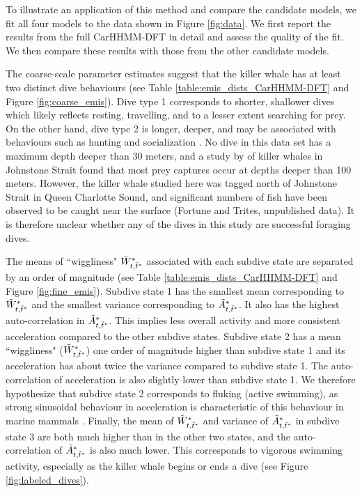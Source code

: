 To illustrate an application of this method and compare the candidate models, we fit all four models to the data shown in Figure \ref{fig:data}. We first report the results from the full CarHHMM-DFT in detail and assess the quality of the fit. We then compare these results with those from the other candidate models.

The coarse-scale parameter estimates suggest that the killer whale has at least two distinct dive behaviours (see Table \ref{table:emis_dists_CarHHMM-DFT} and Figure \ref{fig:coarse_emis}). 
Dive type 1 corresponds to shorter, shallower dives which likely reflects resting, travelling, and to a lesser extent searching for prey.
On the other hand, dive type 2 is longer, deeper, and may be associated with behaviours such as hunting and socialization \citep{Tennessen:2019b}. No dive in this data set has a maximum depth deeper than 30 meters, and a study by \citet{Wright:2017} of killer whales in Johnstone Strait found that most prey captures occur at depths deeper than 100 meters. However, the killer whale studied here was tagged north of Johnstone Strait in Queen Charlotte Sound, and significant numbers of fish have been observed to be caught near the surface (Fortune and Trites, unpublished data). It is therefore unclear whether any of the dives in this study are successful foraging dives.

The means of ``wiggliness" $\tilde{W}^*_{t,\tilde t^*}$ associated with each subdive state are separated by an order of magnitude (see Table \ref{table:emis_dists_CarHHMM-DFT} and Figure \ref{fig:fine_emis}). 
Subdive state 1 has the smallest mean corresponding to $\tilde{W}^*_{t,\tilde t^*}$ and the smallest variance corresponding to $\tilde{A}^*_{t,\tilde t^*}$. It also has the highest auto-correlation in $\tilde{A}^*_{t,\tilde t^*}$. This implies less overall activity and more consistent acceleration compared to the other subdive states. 
Subdive state 2 has a mean ``wiggliness" ($\tilde{W}^*_{t,\tilde t^*}$) one order of magnitude higher than subdive state 1 and its acceleration has about twice the variance compared to subdive state 1. The auto-correlation of acceleration is also slightly lower than subdive state 1. We therefore hypothesize that subdive state 2 corresponds to fluking (active swimming), as strong sinusoidal behaviour in acceleration is characteristic of this behaviour in marine mammals \citep{Simon:2012}.
Finally, the mean of $\tilde{W}^*_{t,\tilde t^*}$ and variance of $\tilde{A}^*_{t,\tilde t^*}$ in subdive state 3 are both much higher than in the other two states, and the auto-correlation of $\tilde{A}^*_{t,\tilde t^*}$ is also much lower. This corresponds to vigorous swimming activity, especially as the killer whale begins or ends a dive (see Figure \ref{fig:labeled_dives}). 

